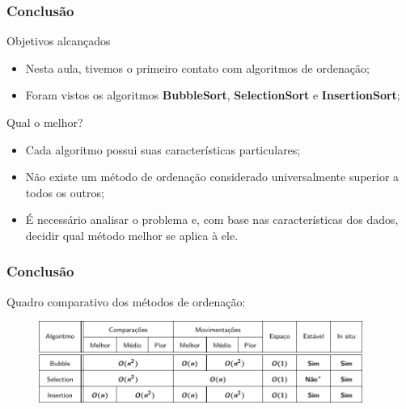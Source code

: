 \documentclass[aspectratio=169]{beamer}
\begin{document}
\begin{frame}
\frametitle{Conclusão}
\begin{block}{Objetivos alcançados}
  \begin{itemize}
  \item Nesta aula, tivemos o primeiro contato com algoritmos de ordenação;
  \item Foram vistos os algoritmos {\bf BubbleSort}, {\bf SelectionSort} e {\bf InsertionSort};
  \end{itemize}
\end{block}
\begin{block}{Qual o melhor?}
\begin{itemize}
  \item Cada algoritmo possui suas características particulares;
  \item Não existe um método de ordenação considerado universalmente superior a todos os outros;
  \item É necessário analisar o problema e, com base nas características dos dados, decidir qual método melhor se aplica à ele.
  \end{itemize} 
\end{block}
\end{frame}


\begin{frame}
\frametitle{Conclusão}
Quadro comparativo dos métodos de ordenação:
\begin{figure}[!h]
  \centering
  \includegraphics[width=300pt]{imgs/quadro_comparativo.png}
  \label{fig_quadro_comparativo}
\end{figure}
\end{frame}

\end{document}
